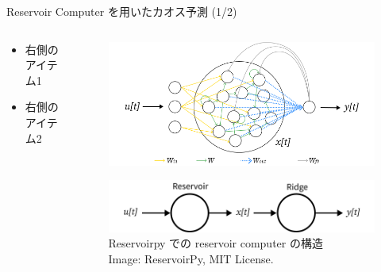 \begin{frame}{Reservoir Computer を用いたカオス予測 (1/2)}
    \begin{columns}[T] %
  
      \begin{column}{.5\textwidth}
        
        \begin{itemize}
          \item 右側のアイテム1
          \item 右側のアイテム2
        \end{itemize}
      \end{column}

      \begin{column}{.5\textwidth}
        \begin{figure}
            \includegraphics[width=\textwidth]{Fig/esn.svg.png}
        \end{figure}  
        \begin{figure}
            \includegraphics[width=\textwidth]{Fig/esn_nodes.svg.png}
            \caption{\scriptsize{Reservoirpy での reservoir computer の構造}\\ \tiny{Image: ReservoirPy, MIT License.}}
        \end{figure}  
      \end{column}
    \end{columns}
  \end{frame}


